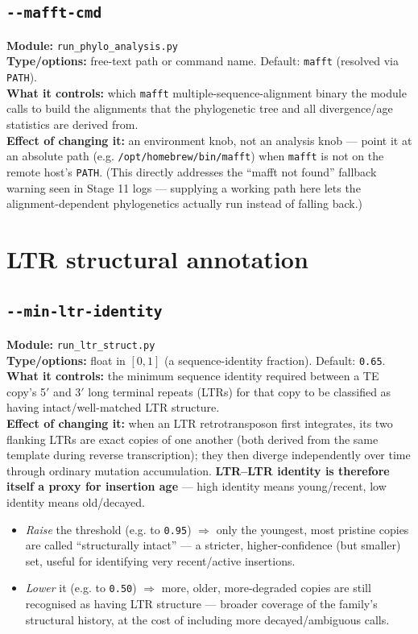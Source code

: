 \documentclass[11pt]{article}
\newcommand{\param}[1]{\subsection*{\texttt{-\/-#1}}}
\begin{document}
\param{mafft-cmd}
\textbf{Module:} \texttt{run\_phylo\_analysis.py}\\
\textbf{Type/options:} free-text path or command name. Default: \texttt{mafft}
(resolved via \texttt{PATH}).\\
\textbf{What it controls:} which \texttt{mafft} multiple-sequence-alignment binary the
module calls to build the alignments that the phylogenetic tree and all
divergence/age statistics are derived from.\\
\textbf{Effect of changing it:} an environment knob, not an analysis knob — point it at
an absolute path (e.g. \texttt{/opt/homebrew/bin/mafft}) when \texttt{mafft} is not on
the remote host's \texttt{PATH}. (This directly addresses the ``mafft not found''
fallback warning seen in Stage 11 logs — supplying a working path here lets the
alignment-dependent phylogenetics actually run instead of falling back.)

\section{LTR structural annotation}

\param{min-ltr-identity}
\textbf{Module:} \texttt{run\_ltr\_struct.py}\\
\textbf{Type/options:} float in $[0,1]$ (a sequence-identity fraction). Default:
\texttt{0.65}.\\
\textbf{What it controls:} the minimum sequence identity required between a TE copy's
5$'$ and 3$'$ long terminal repeats (LTRs) for that copy to be classified as having
intact/well-matched LTR structure.\\
\textbf{Effect of changing it:} when an LTR retrotransposon first integrates, its two
flanking LTRs are exact copies of one another (both derived from the same template
during reverse transcription); they then diverge independently over time through
ordinary mutation accumulation. \textbf{LTR–LTR identity is therefore itself a proxy
for insertion age} — high identity means young/recent, low identity means old/decayed.
\begin{itemize}[leftmargin=1.4em,topsep=2pt,itemsep=2pt]
  \item \emph{Raise} the threshold (e.g. to \texttt{0.95}) $\Rightarrow$ only the
    youngest, most pristine copies are called ``structurally intact'' — a stricter,
    higher-confidence (but smaller) set, useful for identifying very recent/active
    insertions.
  \item \emph{Lower} it (e.g. to \texttt{0.50}) $\Rightarrow$ more, older, more-degraded
    copies are still recognised as having LTR structure — broader coverage of the
    family's structural history, at the cost of including more decayed/ambiguous calls.
\end{itemize}
\end{document}
